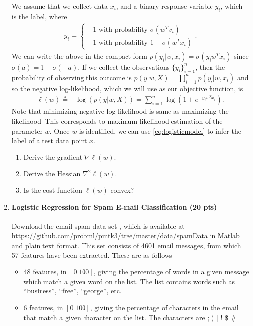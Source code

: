 \begin{enumerate}
    We assume that we collect data $x_i$, and a binary response variable $y_i$, which is the label, where
    \begin{align}
        y_i= \begin{cases}+1 \text{ with probability } \sigma(w^Tx_i)\\
        -1 \text{ with probability } 1-\sigma(w^Tx_i)
        \end{cases}. \label{eq:logisticmodel}
    \end{align}
    We can write the above in the compact form $p(y_i|w,x_i)=\sigma(y_i w^T x_i)$ since $\sigma(a)=1-\sigma(-a)$. If we collect the observations $\{y_i\}_{i=1}^n$, then the probability of observing this outcome is $p(y|w,X)= \prod_{i=1}^n p(y_i|w,x_i)$ and so the negative log-likelihood, which we will use as our objective function, is
    \begin{align*}
        \ell(w) \triangleq -\log(p(y|w,X))= \sum_{i=1}^n \log(1+e^{-y_i w^T x_i}).
    \end{align*}
    Note that minimizing negative log-likelihood is same as maximizing the likelihood. This corresponds to maximum likelihood estimation of the parameter $w$. Once $w$ is identified, we can use \eqref{eq:logisticmodel} to infer the label of a test data point $x$.
\begin{enumerate}
    \item Derive the gradient $\nabla \ell(w)$.
    \item Derive the Hessian $\nabla^2 \ell(w)$.
    \item Is the cost function $\ell(w)$ convex?
\end{enumerate}
 \solution{
 }
 \item \textbf{Logistic Regression for Spam E-mail Classification (20 pts)}\\\\
 Download the email spam data set , which is available at \url{https://github.com/probml/pmtk3/tree/master/data/spamData} in Matlab and plain text format. This set consists of 4601 email messages, from which 57 features have been extracted. These are as follows
 \begin{itemize}
     \item  48 features, in $[0 \; 100]$, giving the percentage of words in a given message which match a given word on the list. The list contains words such as ``business'', ``free'', ``george'', etc.
     \item 6 features, in $[0 \; 100]$, giving the percentage of characters in the email that match a given character on the list. The characters are ; ( [ ! \$ \#

\end{itemize}
\end{enumerate}
